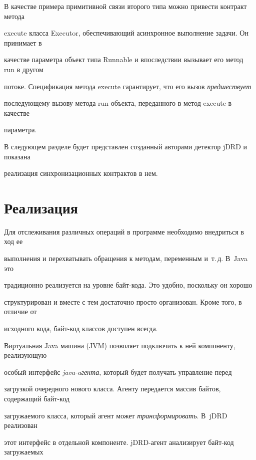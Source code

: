 В качестве примера примитивной связи второго типа можно привести контракт метода

{\sf execute} класса {\sf Executor}, обеспечивающий асинхронное выполнение задачи. Он принимает в

качестве параметра объект типа {\sf Runnable} и впоследствии вызывает его метод {\sf run} в другом

потоке. Спецификация метода {\sf execute} гарантирует, что его вызов \textit{предшествует}

последующему вызову метода {\sf run} объекта, переданного в метод {\sf execute} в качестве

параметра.



  В следующем разделе будет представлен созданный авторами детектор jDRD и показана

реализация синхронизационных контрактов в нем.






\section{Реализация}



  Для отслеживания различных операций в программе необходимо внедриться в ход ее

выполнения и перехватывать обращения к методам, переменным и~т.\,д. В~Java это

традиционно реализуется на уровне байт-ко\-да. Это удобно, поскольку он хорошо

структурирован и вместе с тем достаточно просто организован. Кроме того, в отличие от

исходного кода, байт-код классов доступен всегда.



  Виртуальная Java машина (JVM) позволяет подключить к ней компоненту, реализующую

особый интерфейс \textit{java-aген\-та}, который будет получать управ\-ле\-ние перед

загрузкой очередного нового класса. Агенту передается массив байтов, содержащий байт-код

загружаемого класса, который агент может \textit{трансформировать}. В~jDRD реализован

этот интерфейс в отдельной компоненте. jDRD-агент анализирует байт-код загружаемых

